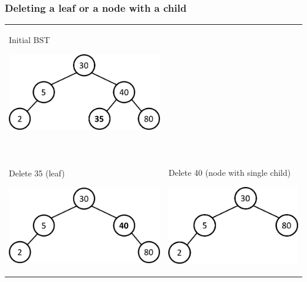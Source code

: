 \documentclass[newPxFont,sthlmFooter,nooffset]{beamer}
\begin{document}
\begin{frame}[t]
  \frametitle{Deleting a leaf or a node with a child}
  \begin{tabular}{p{} p{}}
Initial BST

    \includegraphics[height=0.3\textheight]{./figures/fig17_bst_delete.png}
&   ~\\
~& ~\\
Delete 35 (leaf)

    \includegraphics[height=0.3\textheight]{./figures/fig17_bst_delete1.png}
&
Delete 40 (node with single child)

    \includegraphics[height=0.3\textheight]{./figures/fig17_bst_delete2.png}
\\
  \end{tabular}
\end{frame}
\end{document}
